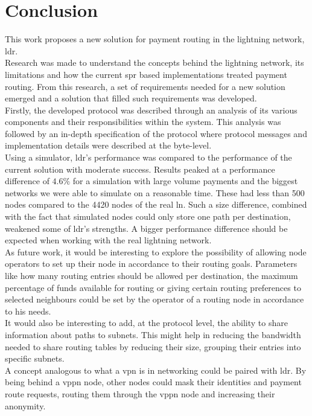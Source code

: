 \section{Conclusion}

This work proposes a new solution for payment routing in the lightning network, \acrfull{ldr}.\\
Research was made to understand the concepts behind the lightning network, its limitations and how the current \acrfull{spr} based implementations treated payment routing. From this research, a set of requirements needed for a new solution emerged and a solution that filled such requirements was developed.\\
Firstly, the developed protocol was described through an analysis of its various components and their responsibilities within the system. This analysis was followed by an in-depth specification of the protocol where protocol messages and implementation details were described at the byte-level.\\
Using a simulator, \acrshort{ldr}'s performance was compared to the performance of the current solution with moderate success. Results peaked at a performance difference of $4.6\%$ for a simulation with large volume payments and the biggest networks we were able to simulate on a reasonable time. These had less than 500 nodes compared to the 4420 nodes of the real \acrshort{ln}. Such a size difference, combined with the fact that simulated nodes could only store one path per destination, weakened some of \acrshort{ldr}'s strengths. A bigger performance difference should be expected when working with the real lightning network.\\
As future work, it would be interesting to explore the possibility of allowing node operators to set up their node in accordance to their routing goals. Parameters like how many routing entries should be allowed per destination, the maximum percentage of funds available for routing or giving certain routing preferences to selected neighbours could be set by the operator of a routing node in accordance to his needs.\\
It would also be interesting to add, at the protocol level, the ability to share information about paths to subnets. This might help in reducing the bandwidth needed to share routing tables by reducing their size, grouping their entries into specific subnets.\\
A concept analogous to what a \acrfull{vpn} is in networking could be paired with \acrshort{ldr}. By being behind a \acrfull{vppn} node, other nodes could mask their identities and payment route requests, routing them through the \acrshort{vppn} node and increasing their anonymity.\\
